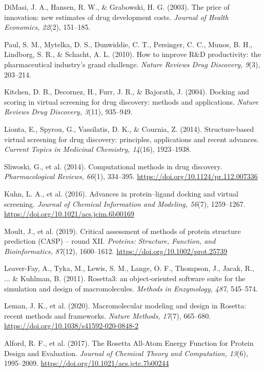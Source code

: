 \documentclass[11pt]{article}
\begin{document}
\begin{thebibliography}{99}

 DiMasi, J. A., Hansen, R. W., \& Grabowski, H. G. (2003). The price of innovation: new estimates of drug development costs. \textit{Journal of Health Economics, 22}(2), 151--185.

 Paul, S. M., Mytelka, D. S., Dunwiddie, C. T., Persinger, C. C., Munos, B. H., Lindborg, S. R., \& Schacht, A. L. (2010). How to improve R\&D productivity: the pharmaceutical industry's grand challenge. \textit{Nature Reviews Drug Discovery, 9}(3), 203--214.

 Kitchen, D. B., Decornez, H., Furr, J. R., \& Bajorath, J. (2004). Docking and scoring in virtual screening for drug discovery: methods and applications. \textit{Nature Reviews Drug Discovery, 3}(11), 935--949.

 Lionta, E., Spyrou, G., Vassilatis, D. K., \& Cournia, Z. (2014). Structure-based virtual screening for drug discovery: principles, applications and recent advances. \textit{Current Topics in Medicinal Chemistry, 14}(16), 1923--1938.

 Sliwoski, G., et al. (2014). Computational methods in drug discovery. \textit{Pharmacological Reviews, 66}(1), 334--395. \url{https://doi.org/10.1124/pr.112.007336}

 Kuhn, L. A., et al. (2016). Advances in protein--ligand docking and virtual screening. \textit{Journal of Chemical Information and Modeling, 56}(7), 1259--1267. \url{https://doi.org/10.1021/acs.jcim.6b00169}

 Moult, J., et al. (2019). Critical assessment of methods of protein structure prediction (CASP) -- round XII. \textit{Proteins: Structure, Function, and Bioinformatics, 87}(12), 1600--1612. \url{https://doi.org/10.1002/prot.25739}

 Leaver-Fay, A., Tyka, M., Lewis, S. M., Lange, O. F., Thompson, J., Jacak, R., ... \& Kuhlman, B. (2011). Rosetta3: an object‐oriented software suite for the simulation and design of macromolecules. \textit{Methods in Enzymology, 487}, 545--574.

 Leman, J. K., et al. (2020). Macromolecular modeling and design in Rosetta: recent methods and frameworks. \textit{Nature Methods, 17}(7), 665--680. \url{https://doi.org/10.1038/s41592-020-0848-2}

 Alford, R. F., et al. (2017). The Rosetta All-Atom Energy Function for Protein Design and Evaluation. \textit{Journal of Chemical Theory and Computation, 13}(6), 1995--2009. \url{https://doi.org/10.1021/acs.jctc.7b00244}


\end{thebibliography}
\end{document}
